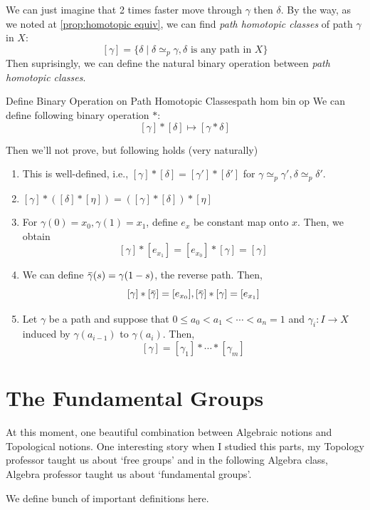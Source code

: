 \documentclass[12pt, a4paper, twoside]{article}
\newcommand{\overbar}[1]{\mkern 1.5mu\overline{\mkern-1.5mu#1\mkern-1.5mu}\mkern 1.5mu}
\theoremstyle{plain}
\begin{document}
We can just imagine that 2 times faster move through $\gamma$ then $\delta$. 
By the way, as we noted at \ref{prop:homotopic equiv}, we can find \textit{path homotopic classes} of path $\gamma$ in $X$: 
\[[\gamma] = \{\delta \mid \delta \simeq_p \gamma, \delta \text{ is any path in $X$}\}\]
Then suprisingly, we can define the natural binary operation between \textit{path homotopic classes}.

\begin{defn}{Define Binary Operation on Path Homotopic Classes}{path hom bin op}
    We can define following binary operation $*$: 
    \[[\gamma] * [\delta] \mapsto [\gamma * \delta]\]
\end{defn}

Then we'll not prove, but following holds (very naturally)
\begin{enumerate}
    \item This is well-defined, i.e., $[\gamma] * [\delta] = [\gamma'] * [\delta']$ for $\gamma \simeq_p \gamma', \delta \simeq_p \delta'$.
    \item $[\gamma] * ([\delta] * [\eta]) = ([\gamma] * [\delta]) * [\eta]$
    \item For $\gamma(0) = x_0, \gamma(1) = x_1$, define $e_{x}$ be constant map onto $x$. Then, we obtain 
    \[[\gamma] * [e_{x_1}] = [e_{x_0}] * [\gamma] = [\gamma]\]
    \item We can define $\overbar{\gamma}(s) = \gamma(1 - s)$, the reverse path. Then, 
    \[[\gamma] * [\overbar{\gamma}] = [e_{x_0}], [\overbar{\gamma}] * [\gamma] = [e_{x_1}]\]
    \item Let $\gamma$ be a path and suppose that $0 \leq a_0 < a_1 < \cdots < a_n = 1$ and $\gamma_i: I \rightarrow X$ induced by 
    $\gamma(a_{i-1})$ to $\gamma(a_{i})$. Then, 
    \[[\gamma] = [\gamma_1] * \cdots * [\gamma_m]\]
\end{enumerate}

\newpage

\section{The Fundamental Groups}

At this moment, one beautiful combination between Algebraic notions and Topological notions. 
One interesting story when I studied this parts, my Topology professor taught us about \lq free groups' 
and in the following Algebra class, Algebra professor taught us about \lq fundamental groups'. 

We define bunch of important definitions here. 
\end{document}
